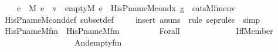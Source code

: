 \begin{isabellebody}
\ \ \ \ {\isachardoublequoteopen}{\isacharparenleft}{\kern0pt}{\isasymforall}e\ {\isasymin}\ M{\isachardot}{\kern0pt}\ e\ {\isasymin}\ v\ {\isasymlongleftrightarrow}\ {\isacharparenleft}{\kern0pt}empty{\isacharparenleft}{\kern0pt}{\isacharhash}{\kern0pt}{\isacharhash}{\kern0pt}M{\isacharcomma}{\kern0pt}\ e{\isacharparenright}{\kern0pt}\ {\isasymand}\ His{\isacharunderscore}{\kern0pt}P{\isacharunderscore}{\kern0pt}name{\isacharunderscore}{\kern0pt}M{\isacharunderscore}{\kern0pt}cond{\isacharparenleft}{\kern0pt}x{\isacharprime}{\kern0pt}{\isacharcomma}{\kern0pt}\ g{\isacharparenright}{\kern0pt}{\isacharparenright}{\kern0pt}{\isacharparenright}{\kern0pt}\ {\isasymlongleftrightarrow}\ sats{\isacharparenleft}{\kern0pt}M{\isacharcomma}{\kern0pt}{\isacharquery}{\kern0pt}fm{\isacharparenleft}{\kern0pt}{}{\isacharcomma}{\kern0pt}{}{\isacharcomma}{\kern0pt}{}{\isacharparenright}{\kern0pt}{\isacharcomma}{\kern0pt}env{\isacharparenright}{\kern0pt}{\isachardoublequoteclose}\ \isanewline
%
\isadelimproof
\ \ %
\endisadelimproof
%
\isatagproof
{}\isamarkupfalse%
\ His{\isacharunderscore}{\kern0pt}P{\isacharunderscore}{\kern0pt}name{\isacharunderscore}{\kern0pt}M{\isacharunderscore}{\kern0pt}cond{\isacharunderscore}{\kern0pt}def\ subset{\isacharunderscore}{\kern0pt}def\ \isanewline
\ \ \isamarkupfalse%
\ {\isacharparenleft}{\kern0pt}insert\ assms\ {\isacharsemicolon}{\kern0pt}\ {\isacharparenleft}{\kern0pt}rule\ sep{\isacharunderscore}{\kern0pt}rules\ {\isacharbar}{\kern0pt}\ simp{\isacharparenright}{\kern0pt}{\isacharplus}{\kern0pt}{\isacharparenright}{\kern0pt}%
\endisatagproof
{\isafoldproof}%
%
\isadelimproof
\ \isanewline
%
\endisadelimproof
\isanewline
{}\isamarkupfalse%
\ \isanewline
\isanewline
{}\isamarkupfalse%
\ His{\isacharunderscore}{\kern0pt}P{\isacharunderscore}{\kern0pt}name{\isacharunderscore}{\kern0pt}M{\isacharunderscore}{\kern0pt}fm\ \ {\isachardoublequoteopen}His{\isacharunderscore}{\kern0pt}P{\isacharunderscore}{\kern0pt}name{\isacharunderscore}{\kern0pt}M{\isacharunderscore}{\kern0pt}fm\ {\isasymequiv}\ \isanewline
\ \ \ \ \ \ \ Forall\isanewline
\ \ \ \ \ \ \ \ \ \ \ \ \ {\isacharparenleft}{\kern0pt}Iff{\isacharparenleft}{\kern0pt}Member{\isacharparenleft}{\kern0pt}{}{\isacharcomma}{\kern0pt}\ {}{\isacharparenright}{\kern0pt}{\isacharcomma}{\kern0pt}\isanewline
\ \ \ \ \ \ \ \ \ \ \ \ \ \ \ \ \ \ And{\isacharparenleft}{\kern0pt}empty{\isacharunderscore}{\kern0pt}fm{\isacharparenleft}{\kern0pt}{}{\isacharparenright}{\kern0pt}{\isacharcomma}{\kern0pt}\isanewline

\end{isabellebody}
